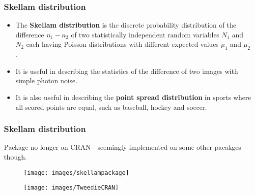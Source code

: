 \documentclass[MAIN.tex]{subfiles}
\begin{document}
\begin{frame}
\frametitle{Skellam distribution}
\large
\begin{itemize}

\item The \textbf{Skellam distribution} is the discrete probability distribution of the difference $n_1-n_2$ of two statistically independent random variables $N_1$ and $N_2$ each having Poisson distributions with different expected values $\mu_1$ and $\mu_2$.
\item It is useful in describing the statistics of the difference of two images with simple photon noise.
\item It is also useful in describing the \textbf{point spread distribution} in sports where all scored points are equal, such as baseball, hockey and soccer.
\end{itemize}
\end{frame}

\begin{frame}
\frametitle{Skellam distribution}
\large
Package no longer on CRAN - seemingly implemented on some other pacakges though.
	\begin{figure}
\centering
\texttt{[image: images/skellampackage]}
\caption{}
\label{fig:skellampackage}
\end{figure}
\end{frame}

\begin{frame}
	\begin{figure}
\centering
\texttt{[image: images/TweedieCRAN]}
\caption{}
\label{fig:TweedieCRAN}
\end{figure}

\end{frame}
\end{document}
